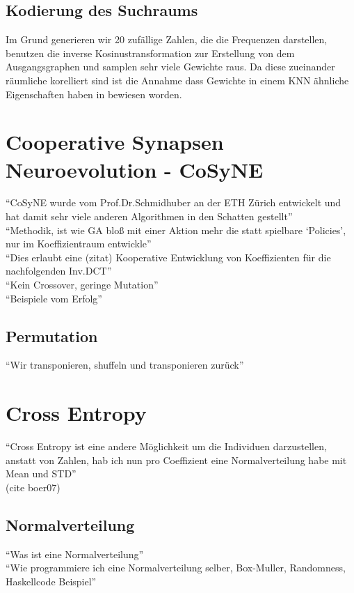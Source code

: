         \subsection{Kodierung des Suchraums}
            Im Grund generieren wir 20 zufällige Zahlen, die die Frequenzen darstellen, benutzen die inverse Kosinustransformation zur Erstellung von dem Ausgangsgraphen und samplen sehr viele Gewichte raus. Da diese zueinander räumliche korelliert sind ist die Annahme dass Gewichte in einem KNN ähnliche Eigenschaften haben in \cite{cosyne1} bewiesen worden. 

    \section{Cooperative Synapsen Neuroevolution - CoSyNE}
        ``CoSyNE wurde vom Prof.Dr.Schmidhuber an der ETH Zürich entwickelt und hat damit sehr viele anderen Algorithmen in den Schatten gestellt''\\
        ``Methodik, ist wie GA bloß mit einer Aktion mehr die statt spielbare `Policies', nur im Koeffizientraum entwickle'' \\
        ``Dies erlaubt eine (zitat) Kooperative Entwicklung von Koeffizienten für die nachfolgenden Inv.DCT'' \\
        ``Kein Crossover, geringe Mutation'' \\
        ``Beispiele vom Erfolg'' \\
        \subsection{Permutation}
            ``Wir transponieren, shuffeln und transponieren zurück''

    \section{Cross Entropy}
        ``Cross Entropy ist eine andere Möglichkeit um die Individuen darzustellen, anstatt von Zahlen, hab ich nun pro Coeffizient eine Normalverteilung habe mit Mean und STD'' \\
        (cite boer07)
        \subsection{Normalverteilung}
            ``Was ist eine Normalverteilung'' \\
            ``Wie programmiere ich eine Normalverteilung selber, Box-Muller, Randomness, Haskellcode Beispiel'' \\
